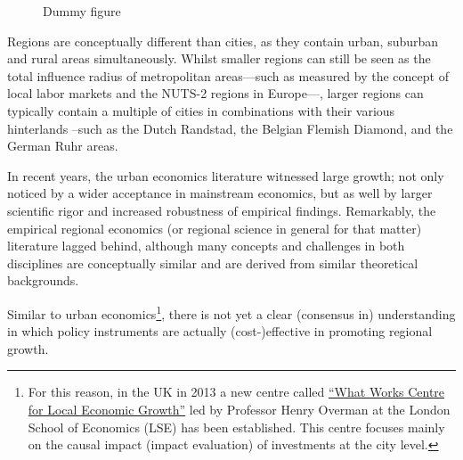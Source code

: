 \documentclass[fleqn,10pt]{SelfArx} %
\begin{document}
\begin{figure}[ht]\centering 
	\hfill
	\caption{Dummy figure}
	\label{fig:dummy}
\end{figure}

Regions are conceptually different than cities, as they contain urban, suburban and rural areas simultaneously. Whilst smaller regions can still be seen as the total influence radius of metropolitan areas---such as measured by the concept of local labor markets and the NUTS-2 regions in Europe---, larger regions can typically contain a multiple of cities in combinations with their various hinterlands --such as the Dutch Randstad, the Belgian Flemish Diamond, and the German Ruhr areas. 

In recent years, the urban economics literature witnessed large growth; not only noticed by a wider acceptance in mainstream economics, but as well by larger scientific rigor and increased robustness of empirical findings. Remarkably, the empirical regional economics (or regional science in general for that matter) literature lagged behind, although many concepts and challenges in both disciplines are conceptually similar and are derived from similar theoretical backgrounds. 

Similar to urban economics\footnote{For this reason, in the UK in 2013 a new centre called \href{http://www.whatworksgrowth.org/}{``What Works Centre for Local Economic Growth''} led by Professor Henry Overman at the London School of Economics (LSE) has been established. This centre focuses mainly on the causal impact (impact evaluation) of investments at the city level.}, there is not yet a clear (consensus in) understanding in which policy instruments are actually (cost-)effective in promoting regional growth. 
\end{document}
